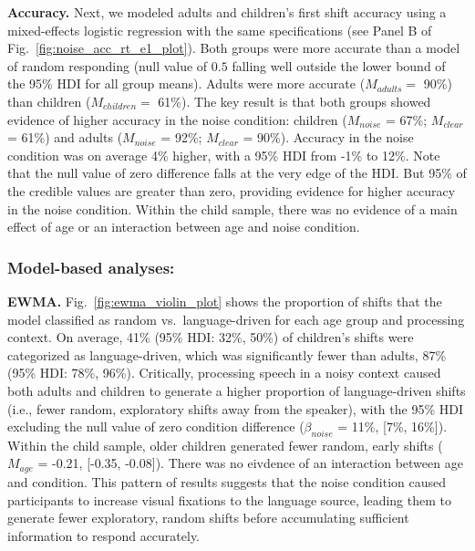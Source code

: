 \documentclass[10pt, letterpaper]{article}
\begin{document}
\textbf{Accuracy.} Next, we modeled adults and children's first shift
accuracy using a mixed-effects logistic regression with the same
specifications (see Panel B of Fig.~\ref{fig:noise_acc_rt_e1_plot}).
Both groups were more accurate than a model of random responding (null
value of \(0.5\) falling well outside the lower bound of the 95\% HDI
for all group means). Adults were more accurate (\(M_{adults} =\) 90\%)
than children (\(M_{children} =\) 61\%). The key result is that both
groups showed evidence of higher accuracy in the noise condition:
children (\(M_{noise}\) = 67\%; \(M_{clear}\) = 61\%) and adults
(\(M_{noise}\) = 92\%; \(M_{clear}\) = 90\%). Accuracy in the noise
condition was on average 4\% higher, with a 95\% HDI from -1\% to 12\%.
Note that the null value of zero difference falls at the very edge of
the HDI. But 95\% of the credible values are greater than zero,
providing evidence for higher accuracy in the noise condition. Within
the child sample, there was no evidence of a main effect of age or an
interaction between age and noise condition.

\hypertarget{model-based-analyses}{%
\subsubsection{Model-based analyses:}\label{model-based-analyses}}

\textbf{EWMA.} Fig.~\ref{fig:ewma_violin_plot} shows the proportion of
shifts that the model classified as random vs.~language-driven for each
age group and processing context. On average, 41\% (95\% HDI: 32\%,
50\%) of children's shifts were categorized as language-driven, which
was significantly fewer than adults, 87\% (95\% HDI: 78\%, 96\%).
Critically, processing speech in a noisy context caused both adults and
children to generate a higher proportion of language-driven shifts
(i.e., fewer random, exploratory shifts away from the speaker), with the
95\% HDI excluding the null value of zero condition difference
(\(\beta_{noise}\) = 11\%, {[}7\%, 16\%{]}). Within the child sample,
older children generated fewer random, early shifts (\(M_{age}\) =
-0.21, {[}-0.35, -0.08{]}). There was no eivdence of an interaction
between age and condition. This pattern of results suggests that the
noise condition caused participants to increase visual fixations to the
language source, leading them to generate fewer exploratory, random
shifts before accumulating sufficient information to respond accurately.
\end{document}
